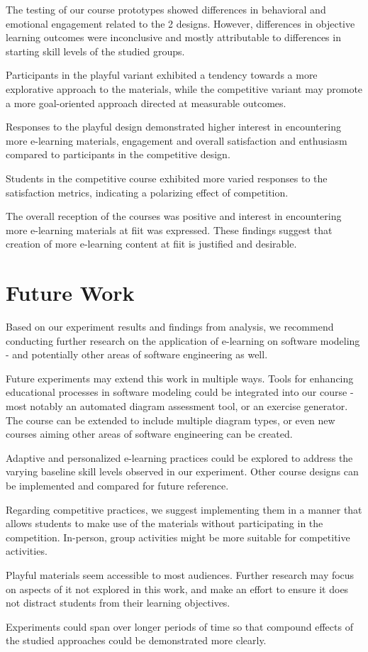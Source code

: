 The testing of our course prototypes showed differences in behavioral and emotional engagement related to the 2 designs. However, differences in objective learning outcomes were inconclusive and mostly attributable to differences in starting skill levels of the studied groups. 

Participants in the playful variant exhibited a tendency towards a more explorative approach to the materials, while the competitive variant may promote a more goal-oriented approach directed at measurable outcomes.

Responses to the playful design demonstrated higher interest in encountering more e-learning materials, engagement and overall satisfaction and enthusiasm compared to participants in the competitive design.

Students in the competitive course exhibited more varied responses to the satisfaction metrics, indicating a polarizing effect of competition. 

The overall reception of the courses was positive and interest in encountering more e-learning materials at \ac{fiit} was expressed. These findings suggest that creation of more e-learning content at \ac{fiit} is justified and desirable.


\section{Future Work}

Based on our experiment results and findings from analysis, we recommend conducting further research on the application of e-learning on software modeling - and potentially other areas of software engineering as well. 

Future experiments may extend this work in multiple ways. Tools for enhancing educational processes in software modeling could be integrated into our course - most notably an automated diagram assessment tool, or an exercise generator. The course can be extended to include multiple diagram types, or even new courses aiming other areas of software engineering can be created.

Adaptive and personalized e-learning practices could be explored to address the varying baseline skill levels observed in our experiment. Other course designs can be implemented and compared for future reference.

Regarding competitive practices, we suggest implementing them in a manner that allows students to make use of the materials without participating in the competition. In-person, group activities might be more suitable for competitive activities.

Playful materials seem accessible to most audiences. Further research may focus on aspects of it not explored in this work, and make an effort to ensure it does not distract students from their learning objectives. 

Experiments could span over longer periods of time so that compound effects of the studied approaches could be demonstrated more clearly.